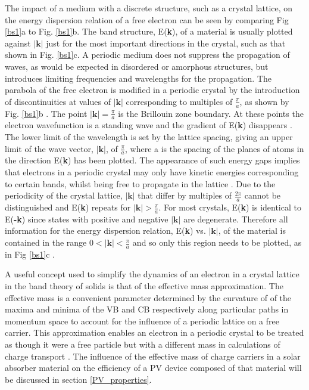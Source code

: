 \documentclass[11pt, twoside]{report}
\begin{document}
The impact of a medium with a discrete structure, such as a crystal lattice, on the energy dispersion relation of a free electron can be seen by comparing Fig \ref{bs1}a to Fig. \ref{bs1}b.
The band structure, E(\textbf{k}), of a material is usually plotted against $|\textbf{k}|$ just for the most important directions in the crystal, such as that shown in Fig. \ref{bs1}c. A periodic medium does not suppress the propagation of waves, as would be expected in disordered or amorphous structures, but introduces limiting frequencies and wavelengths for the propagation. 
The parabola of the free electron is modified in a periodic crystal by the introduction of discontinuities at values of $|\textbf{k}|$ corresponding to multiples of $\frac{\pi}{a}$, as shown by Fig. \ref{bs1}b \cite{small_semiconductor2}. The point $|\textbf{k}| = \frac{\pi}{a}$ is the Brillouin zone boundary. At these points the electron wavefunction is a standing wave and the gradient of E(\textbf{k}) disappears \cite{Nelson3}.
The lower limit of the wavelength is set by the lattice spacing, giving an upper limit of the wave vector, $|\textbf{k}|$, of $\frac{\pi}{a}$, where a is the spacing of the planes of atoms in the direction E(\textbf{k}) has been plotted.  The appearance of such energy gaps implies that electrons in a periodic crystal may only have kinetic energies corresponding to certain bands, whilst being free to propagate in the lattice \cite{small_semiconductor2}.
Due to the periodicity of the crystal lattice, $|\textbf{k}|$  that differ by multiples of $\frac{2\pi}{a}$ cannot be distinguished and E(\textbf{k}) repeats for $|\textbf{k}| > \frac{\pi}{a}$. For most crystals, E(\textbf{k}) is identical to E(\textbf{-k}) since states with positive and negative $|\textbf{k}|$ are degenerate. Therefore all information for the energy dispersion relation, E(\textbf{k}) vs. $|\textbf{k}|$, of the material is contained in the range $0 < |\textbf{k}| < \frac{\pi}{a}$ and so only this region needs to be plotted, as in Fig \ref{bs1}c \cite{Nelson3}. 

A useful concept used to simplify the dynamics of an electron in a crystal lattice in the band theory of solids is that of the effective mass approximation. The effective mass is a convenient parameter determined by the curvature of of the maxima and minima of the VB and CB respectively along particular paths in momentum space to account for the influence of a periodic lattice on a free carrier. This approximation enables an electron in a periodic crystal to be treated as though it were a free particle but with a different mass in calculations of charge transport \cite{small_semiconductor2}.
The influence of the effective mass of charge carriers in a solar absorber material on the efficiency of a PV device composed of that material will be discussed in section \ref{PV_properties}.
\end{document}
